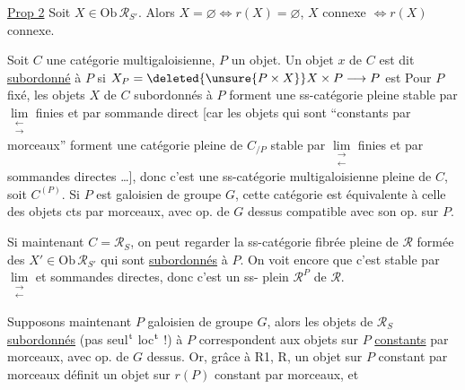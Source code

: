 \uline{Prop 2} Soit $X\in\mathrm{Ob}\,\mathscr R_{S'}$. Alors $X=\varnothing\Longleftrightarrow r(X)=\varnothing$, $X$ connexe $\Longleftrightarrow r(X)$ connexe.

Soit $C$ une catégorie multigaloisienne, $P$ un objet.
Un objet $x$ de $C$ est dit \uline{subordonné} à $P$ si $X_P=\deleted{\unsure{P\times X}}X\times P\longrightarrow P$ est 
Pour $P$ fixé, les objets $X$ de $C$ subordonnés à $P$ forment une ss-catégorie pleine stable par $\mathop{\mathrm{lim}}\limits_{\substack{\longleftarrow\\\longrightarrow}}$ finies et par sommande direct [car les objets  qui sont ``constants par morceaux'' forment une catégorie pleine de $C_{/P}$ stable par $\mathop{\mathrm{lim}}\limits_{\substack{\longrightarrow\\\longleftarrow}}$ finies et par sommandes directes \ldots],
donc c'est une ss-catégorie multigaloisienne pleine de $C$, soit $C^{(P)}$. Si $P$ est galoisien de groupe $G$, cette catégorie est équivalente à celle des objets  cts par morceaux,  avec op. de $G$ dessus compatible avec son op. sur $P$.

Si maintenant $C=\mathscr R_S$, on peut regarder la ss-catégorie fibrée pleine de $\mathscr R$ formée des $X'\in\mathrm{Ob}\,\mathscr R_{S'}$ qui sont  \uline{subordonnés} à $P$. On voit encore que c'est stable par $\mathop{\mathrm{lim}}\limits_{\substack{\longrightarrow\\\longleftarrow}}$ et sommandes directes, donc c'est un ss-  plein $\mathscr R^P$ de $\mathscr R$.

Supposons maintenant $P$ galoisien de groupe $G$, alors les objets de $\mathscr R_S$ \uline{subordonnés} (pas seul$^{\rm t}$ loc$^{\rm t}$ !) à $P$ correspondent aux objets sur $P$ \uline{constants} par morceaux, avec op. de $G$ dessus. Or, grâce à R1, R, un objet  sur $P$ constant par morceaux définit un objet  sur $r(P)$ constant par morceaux, et
